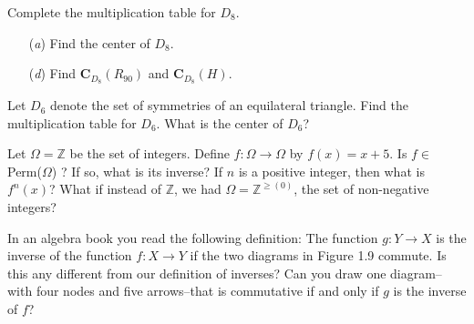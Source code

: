 \documentclass[12pt,letterpaper,boxed]{hmcpset}
\begin{document}

\begin{problem}[1.1.1]
Complete the multiplication table for $ D_8 $. 
\end{problem}

\begin{solution}

\end{solution}

\clearpage

\begin{problem}[1.1.5]
\begin{itemize}
  \item[(\textit{a})] Find the center of $ D_8 $.
  
  \item[(\textit{d})] Find $ \textbf{C}_{D_8} (R_{90}) $ and $ \textbf{C}_{D_8} (H) $.
\end{itemize}
\end{problem}

\begin{solution}
\end{solution}

\clearpage

\begin{problem}[1.1.6]
Let $ D_6 $ denote the set of symmetries of an equilateral triangle. Find the multiplication table for $ D_6 $. What is the center of $ D_6 $?
\end{problem}

\begin{solution}
\end{solution}

\clearpage


\begin{problem}[1.2.1]
Let $ \Omega = \mathbb{Z} $ be the set of integers. Define $ f: \Omega \to \Omega $ by $ f(x) = x + 5 $. Is $ f \in $ Perm($ \Omega $) ? If so, what is its inverse? If $ n $ is a positive integer, then what is $ f^{n}(x) $? What if instead of $ \mathbb{Z} $, we had $ \Omega = \mathbb{Z}^{\geq(0)} $, the set of non-negative integers? 
\end{problem}

\begin{solution}
\end{solution}

\clearpage

\begin{problem}[1.2.11]
In an algebra book you read the following definition: The function $ g: Y \to X $ is the inverse of the function $ f: X \to Y $ if the two diagrams in Figure 1.9 commute. 
Is this any different from our definition of inverses? Can you draw one diagram--with four nodes and five arrows--that is commutative if and only if $ g $ is the inverse of $ f $?
\end{problem}

\begin{solution}

\end{solution}
\end{document}
